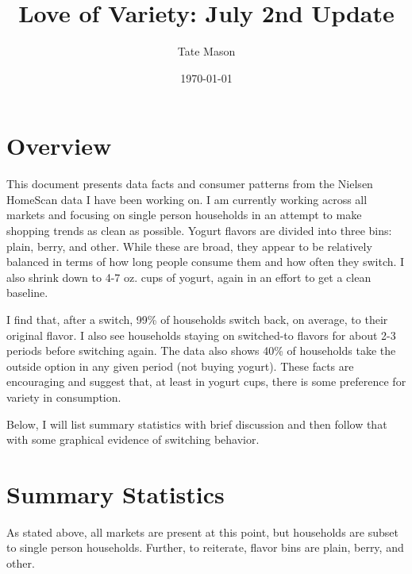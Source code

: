 \documentclass[11pt]{article}
\title{Love of Variety: July 2nd Update}
\author{Tate Mason}
\date{\today}
\theoremstyle{definition}
\theoremstyle{remark}
\begin{document}
\maketitle
\thispagestyle{empty}

\section{Overview}

This document presents data facts and consumer patterns from the Nielsen
HomeScan data I have been working on. I am currently working across all markets
and focusing on single person households in an attempt to make shopping trends
as clean as possible. Yogurt flavors are divided into three bins: plain, berry,
and other. While these are broad, they appear to be relatively balanced in terms
of how long people consume them and how often they switch. I also shrink down to
4-7 oz. cups of yogurt, again in an effort to get a clean baseline.

I find that, after a switch, 99\% of households switch back, on average, to
their original flavor. I also see households staying on switched-to flavors for
about 2-3 periods before switching again. The data also shows 40\% of
households take the outside option in any given period (not buying yogurt).
These facts are encouraging and suggest that, at least in yogurt cups, there is
some preference for variety in consumption.

Below, I will list summary statistics with brief discussion and then follow that
with some graphical evidence of switching behavior.

\section{Summary Statistics}

As stated above, all markets are present at this point, but households are
subset to single person households. Further, to reiterate, flavor bins are
plain, berry, and other.
\end{document}
